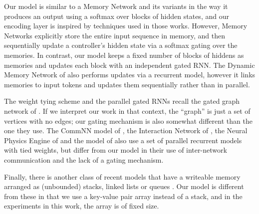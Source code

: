 \documentclass{article} \usepackage{iclr2016_conference,times}
\begin{document}
Our model is similar to a Memory Network and its variants \citep{MemNet, MemN2N, chandar2016hierarchical, miller2016key} in the way it produces an output using a softmax over blocks of hidden states, and our encoding layer is inspired by techniques used in those works. However, Memory Networks explicitly
store the entire input sequence in memory, and then sequentially update a controller's hidden state via a softmax gating over the memories. In contrast, our model keeps a fixed number of blocks of hiddens as memories and updates each block with an independent gated RNN. 
The Dynamic Memory Network of \citep{DMN} also performs updates via a recurrent model, however it links memories to input tokens and updates them sequentially rather than in parallel.




The weight tying scheme and the parallel gated RNNs recall the gated graph network of \citep{GGSNN}.  
If we interpret our work in that context, the ``graph'' is just a set of vertices with no edges; our gating mechanism is also somewhat different than the one they use.   
The CommNN model of \citep{CommNN}, the Interaction Network of \citep{InteractionNet}, the Neural Physics Engine of \citep{Chang2016} and the model of \citep{FragkiadakiALM15} also use a set of parallel recurrent models with tied weights, but differ from our model in their use of inter-network communication and the lack of a gating mechanism.


Finally, there is another class of recent models that have a writeable memory
arranged as (unbounded) stacks, linked lists or queues \citep{joulin2015inferring, grefenstette2015learning}.  Our model is different from these in that we use a key-value pair array instead of a stack, and in the experiments in this work, the array is of fixed size.
\end{document}
